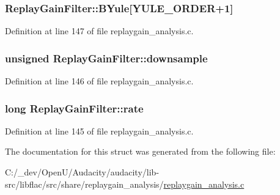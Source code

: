 \subsubsection[{\texorpdfstring{B\+Yule}{BYule}}]{ Replay\+Gain\+Filter\+::\+B\+Yule\mbox{[}{\bf Y\+U\+L\+E\+\_\+\+O\+R\+D\+ER}+1\mbox{]}}\hypertarget{struct_replay_gain_filter_a47d88bce1d1df5d2a4a7c391cd710fc3}{}\label{struct_replay_gain_filter_a47d88bce1d1df5d2a4a7c391cd710fc3}


Definition at line 147 of file replaygain\+\_\+analysis.\+c.

\subsubsection[{\texorpdfstring{downsample}{downsample}}]{\setlength{\rightskip}{0pt plus 5cm}unsigned Replay\+Gain\+Filter\+::downsample}\hypertarget{struct_replay_gain_filter_a4a78bc4bc1878b806a36230c2add19b5}{}\label{struct_replay_gain_filter_a4a78bc4bc1878b806a36230c2add19b5}


Definition at line 146 of file replaygain\+\_\+analysis.\+c.

\subsubsection[{\texorpdfstring{rate}{rate}}]{\setlength{\rightskip}{0pt plus 5cm}long Replay\+Gain\+Filter\+::rate}\hypertarget{struct_replay_gain_filter_a5ae0ffecc9971135049c04bdaaff4908}{}\label{struct_replay_gain_filter_a5ae0ffecc9971135049c04bdaaff4908}


Definition at line 145 of file replaygain\+\_\+analysis.\+c.



The documentation for this struct was generated from the following file\+:\begin{DoxyCompactItemize}
\item 
C\+:/\+\_\+dev/\+Open\+U/\+Audacity/audacity/lib-\/src/libflac/src/share/replaygain\+\_\+analysis/\hyperlink{replaygain__analysis_8c}{replaygain\+\_\+analysis.\+c}\end{DoxyCompactItemize}
